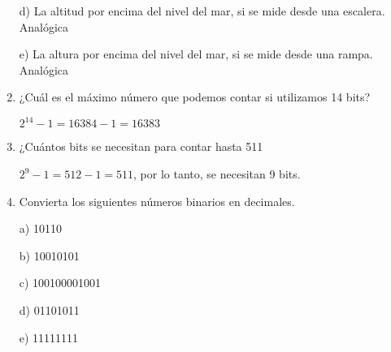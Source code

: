 \documentclass[a4paper, 12pt]{article}
\newcommand{\Aspace}{0.2cm}
\begin{document}
\begin{enumerate}
            \vspace{\Aspace} \par
            d) La altitud por encima del nivel del mar, si se mide desde una escalera.
            \\ { \color{azul} Analógica }

            \vspace{\Aspace} \par
            e) La altura por encima del nivel del mar, si se mide desde una rampa.
            \\ { \color{azul} Analógica }
       

        \item ¿Cuál es el máximo número que podemos contar si utilizamos 14 bits?
            \vspace{\Aspace} \par
            { \color{azul} $2^{14} - 1 = 16384 - 1 = 16383$ }
 

        \item ¿Cuántos bits se necesitan para contar hasta 511
            \vspace{\Aspace} \par
            { \color{azul} $2^{9} -1 = 512 - 1 = 511$, por lo tanto, se necesitan 9 bits. }
        

        \item Convierta los siguientes números binarios en decimales.
            \vspace{\Aspace} \par
            a) 10110
            \\ { \color{azul}  }

            \vspace{\Aspace} \par
            b) 10010101
            \\ { \color{azul}  }

            \vspace{\Aspace} \par
            c) 100100001001
            \\ { \color{azul}  }

            \vspace{\Aspace} \par
            d) 01101011
            \\ { \color{azul}  }

            \vspace{\Aspace} \par
            e) 11111111
            \\ { \color{azul}  }


\end{enumerate}
\end{document}
